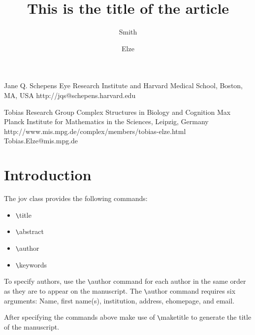 \documentclass{jov}
\begin{document}
\title{This is the title of the article}

\author{Smith}{Jane Q.}
 {Schepens Eye Research Institute}
 {and Harvard Medical School, Boston, MA, USA}
 {http://}{jqs@schepens.harvard.edu}
\author{Elze}{Tobias}
 {Research Group Complex Structures in Biology and Cognition}
 {Max Planck Institute for Mathematics in the Sciences, Leipzig, Germany}
 {http://www.mis.mpg.de/complex/members/tobias-elze.html}
 {Tobias.Elze@mis.mpg.de}


\maketitle

\section{Introduction}

The jov class provides the following commands:
\begin{itemize}
\item \verb=\=title
\item \verb=\=abstract
\item \verb=\=author
\item \verb=\=keywords
\end{itemize}
To specify authors, use the \verb=\=author command for each author in the 
same order as they are to appear on the manuscript. The \verb=\=author 
command requires six arguments: Name, first name(s), institution, address, 
ehomepage, and email.

After specifying the commands above make use of \verb=\=maketitle to 
generate the title of the manuscript.
\end{document}
